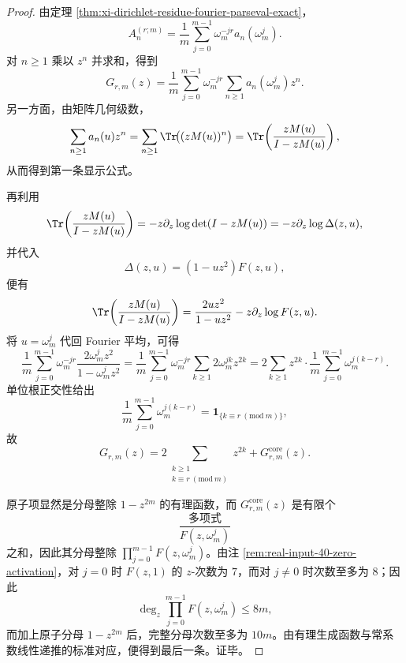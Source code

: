 \begin{proof}
由定理 \ref{thm:xi-dirichlet-residue-fourier-parseval-exact}，
\[
A_n^{(r;m)}
=
\frac1m\sum_{j=0}^{m-1}\omega_m^{-jr}a_n(\omega_m^j).
\]
对 \(n\ge 1\) 乘以 \(z^n\) 并求和，得到
\[
G_{r,m}(z)
=
\frac1m\sum_{j=0}^{m-1}\omega_m^{-jr}
\sum_{n\ge 1}a_n(\omega_m^j)z^n.
\]
另一方面，由矩阵几何级数，
\[
\sum_{n\ge 1}a_n(u)z^n
=
\sum_{n\ge 1}\Tr\!\bigl((zM(u))^n\bigr)
=
\Tr\!\left(\frac{zM(u)}{I-zM(u)}\right),
\]
从而得到第一条显示公式。

再利用
\[
\Tr\!\left(\frac{zM(u)}{I-zM(u)}\right)
=
-z\partial_z\log\det(I-zM(u))
=
-z\partial_z\log\Delta(z,u),
\]
并代入
\[
\Delta(z,u)=(1-uz^2)F(z,u),
\]
便有
\[
\Tr\!\left(\frac{zM(u)}{I-zM(u)}\right)
=
\frac{2uz^2}{1-uz^2}
-z\partial_z\log F(z,u).
\]
将 \(u=\omega_m^j\) 代回 Fourier 平均，可得
\[
\frac1m\sum_{j=0}^{m-1}\omega_m^{-jr}\frac{2\omega_m^j z^2}{1-\omega_m^j z^2}
=
\frac1m\sum_{j=0}^{m-1}\omega_m^{-jr}
\sum_{k\ge 1}2\omega_m^{jk}z^{2k}
=
2\sum_{k\ge 1}z^{2k}\cdot
\frac1m\sum_{j=0}^{m-1}\omega_m^{j(k-r)}.
\]
单位根正交性给出
\[
\frac1m\sum_{j=0}^{m-1}\omega_m^{j(k-r)}
=
\mathbf 1_{\{k\equiv r\ (\mathrm{mod}\ m)\}},
\]
故
\[
G_{r,m}(z)
=
2\sum_{\substack{k\ge 1\\ k\equiv r\ (\mathrm{mod}\ m)}}z^{2k}
+G_{r,m}^{\mathrm{core}}(z).
\]

原子项显然是分母整除 \(1-z^{2m}\) 的有理函数，而 \(G_{r,m}^{\mathrm{core}}(z)\) 是有限个
\[
\frac{\text{多项式}}{F(z,\omega_m^j)}
\]
之和，因此其分母整除 \(\prod_{j=0}^{m-1}F(z,\omega_m^j)\)。由注
\ref{rem:real-input-40-zero-activation}，对 \(j=0\) 时 \(F(z,1)\) 的 \(z\)-次数为 \(7\)，而对 \(j\neq 0\) 时次数至多为 \(8\)；因此
\[
\deg_z\prod_{j=0}^{m-1}F(z,\omega_m^j)\le 8m,
\]
而加上原子分母 \(1-z^{2m}\) 后，完整分母次数至多为 \(10m\)。由有理生成函数与常系数线性递推的标准对应，便得到最后一条。证毕。
\end{proof}

